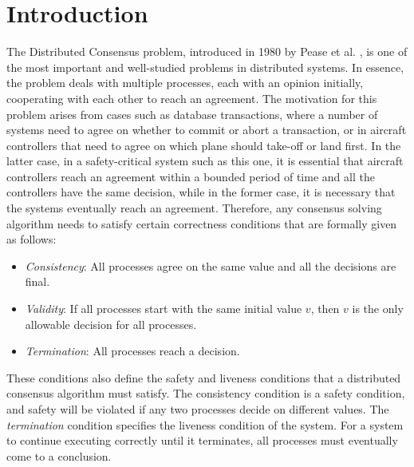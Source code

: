 ﻿\section{Introduction}

The Distributed Consensus problem, introduced in 1980 by Pease et al. \cite{PeaseSL80}, is one of the most important and well-studied problems in distributed systems. In essence, the problem deals with multiple processes, each with an opinion initially, cooperating with each other to reach an agreement. The motivation for this problem arises from cases such as database transactions, where a number of systems need to agree on whether to commit or abort a transaction, or in aircraft controllers that need to agree on which plane should take-off or land first. In the latter case, in a safety-critical system such as this one, it is essential that aircraft controllers reach an agreement within a bounded period of time and all the controllers have the same decision, while in the former case, it is necessary that the systems eventually reach an agreement. Therefore, any consensus solving algorithm needs to satisfy certain correctness conditions that are formally given as follows:

\begin{itemize}
    \item \textit{Consistency}: All processes agree on the same value and all the decisions are final.
    \item \textit{Validity}: If all processes start with the same initial value $v$, then $v$ is the only allowable decision for all processes.
    \item \textit{Termination}: All processes reach a decision.
\end{itemize}


These conditions also define the safety and liveness conditions that a distributed consensus algorithm must satisfy.  The consistency condition is a safety condition, and safety will be violated if any two processes decide on different values. The \textit{termination} condition specifies the liveness condition of the system. For a system to continue executing correctly until it terminates, all processes must eventually come to a conclusion.

